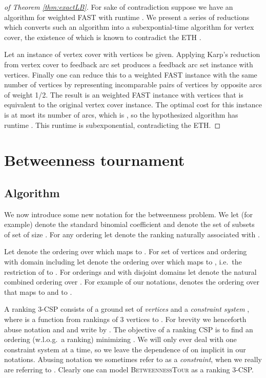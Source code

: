 \documentclass[envcountsame,oribibl]{llncs}
\newcommand{\betTour}{\textsc{BetweennessTour}}
\begin{document}
\begin{proof}[of Theorem \ref{thm:exactLB}]
For sake of contradiction suppose we have an algorithm for weighted FAST with runtime . We present a series of reductions which converts such an algorithm into a subexpontial-time algorithm for vertex cover, the existence of which is known to contradict the ETH \cite{Flum06}.

Let an instance of vertex cover with  vertices be given. Applying Karp's reduction from vertex cover to feedback arc set \cite{Karp72} produces a feedback arc set instance with  vertices. Finally one can reduce this to a weighted FAST instance with the same number of vertices by representing incomparable pairs of vertices by opposite arcs of weight 1/2. The result is an weighted FAST instance with  vertices that is equivalent to the original vertex cover instance. The optimal cost for this instance is at most its number of arcs, which is , so the hypothesized algorithm has runtime . This runtime is subexponential, contradicting the ETH.
\end{proof}


\section{Betweenness tournament}  \label{sec:bet}

\subsection{Algorithm}  \label{sec:betAlg}

We now introduce some new notation for the betweenness problem. We let  (for example) denote the standard binomial coefficient and  denote the set of subsets of set  of size . For any ordering  let  denote the ranking naturally associated with .

Let  denote the ordering over  which maps  to .
For set  of vertices and ordering  with domain including  let  denote the ordering over  which maps  to , i.e.\ the restriction of  to . For orderings  and  with disjoint domains let   denote the natural combined ordering over . For example of our notations,  denotes the ordering over  that maps  to  and  to .

A ranking 3-CSP consists of a ground set  of \emph{vertices} and a \emph{constraint system} , where  is a function from rankings of 3 vertices to . For brevity we henceforth abuse notation and and write  by . The objective of a ranking CSP is to find an ordering  (w.l.o.g.\ a ranking) minimizing . We will only ever deal with one constraint system  at a time, so we leave the dependence of  on  implicit in our notations. Abusing notation we sometimes refer to  as a \emph{constraint}, when we really are referring to .
Clearly one can model \betTour{} as a ranking 3-CSP.
\end{document}
